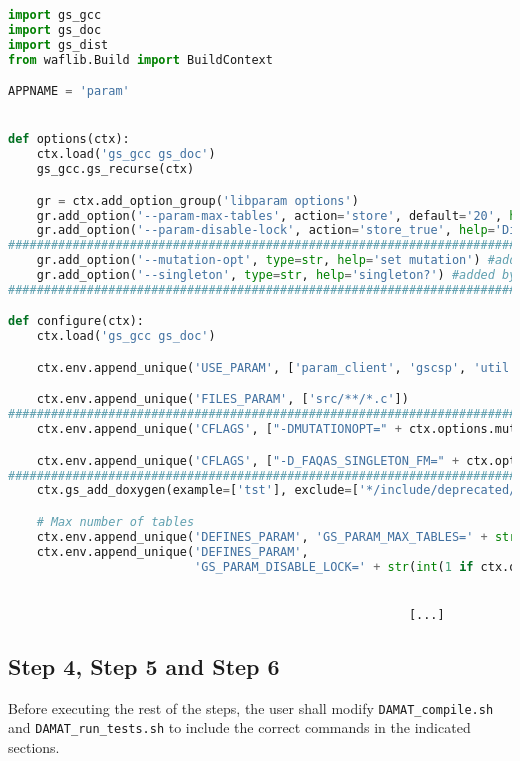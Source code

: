 \begin{lstlisting}[language=python]
import gs_gcc
import gs_doc
import gs_dist
from waflib.Build import BuildContext

APPNAME = 'param'


def options(ctx):
    ctx.load('gs_gcc gs_doc')
    gs_gcc.gs_recurse(ctx)

    gr = ctx.add_option_group('libparam options')
    gr.add_option('--param-max-tables', action='store', default='20', help='Set max table instances')
    gr.add_option('--param-disable-lock', action='store_true', help='Disable table locking')
#####################################################################################################
    gr.add_option('--mutation-opt', type=str, help='set mutation') #added by FAQAS
    gr.add_option('--singleton', type=str, help='singleton?') #added by FAQAS
#####################################################################################################

def configure(ctx):
    ctx.load('gs_gcc gs_doc')

    ctx.env.append_unique('USE_PARAM', ['param_client', 'gscsp', 'util'])

    ctx.env.append_unique('FILES_PARAM', ['src/**/*.c'])
#####################################################################################################
    ctx.env.append_unique('CFLAGS', ["-DMUTATIONOPT=" + ctx.options.mutation_opt]) #added by FAQAS

    ctx.env.append_unique('CFLAGS', ["-D_FAQAS_SINGLETON_FM=" + ctx.options.singleton]) #added by FAQAS
####################################################################################################
    ctx.gs_add_doxygen(example=['tst'], exclude=['*/include/deprecated/param/*'])

    # Max number of tables
    ctx.env.append_unique('DEFINES_PARAM', 'GS_PARAM_MAX_TABLES=' + str(int(ctx.options.param_max_tables)))
    ctx.env.append_unique('DEFINES_PARAM',
                          'GS_PARAM_DISABLE_LOCK=' + str(int(1 if ctx.options.param_disable_lock else 0)))


														[...]

\end{lstlisting}


\subsection{Step 4, Step 5 and Step 6}

Before executing the rest of the steps, the user shall modify \texttt{DAMAT\_compile.sh} and \texttt{DAMAT\_run\_tests.sh} to include the correct commands in the indicated sections.

